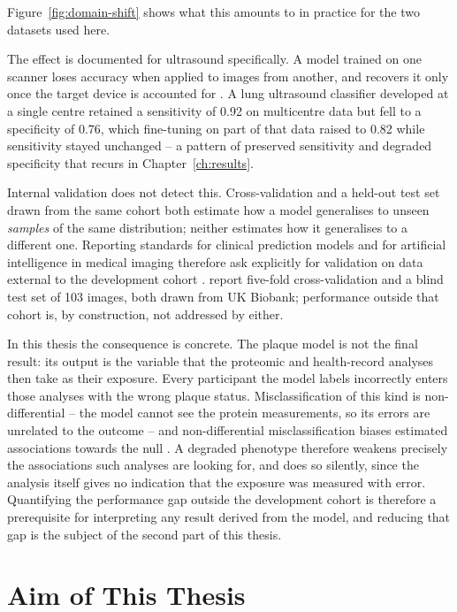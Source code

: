 Figure~\ref{fig:domain-shift} shows what this amounts to in practice for the two datasets used
here.

The effect is documented for ultrasound specifically. A model trained on one scanner loses
accuracy when applied to images from another, and recovers it only once the target device is
accounted for \cite{soylu2025migration}. A lung ultrasound classifier developed at a single
centre retained a sensitivity of 0.92 on multicentre data but fell to a specificity of 0.76,
which fine-tuning on part of that data raised to 0.82 while sensitivity stayed unchanged
\cite{wu2024generalizability} -- a pattern of preserved sensitivity and degraded specificity
that recurs in Chapter~\ref{ch:results}.

Internal validation does not detect this. Cross-validation and a held-out test set drawn
from the same cohort both estimate how a model generalises to unseen \emph{samples} of the
same distribution; neither estimates how it generalises to a different one. Reporting
standards for clinical prediction models and for artificial intelligence in medical imaging
therefore ask explicitly for validation on data external to the development cohort
\cite{collins2015tripod, mongan2020claim}. \textcite{omarov2024deep} report
five-fold cross-validation and a blind test set of 103 images, both drawn from UK Biobank;
performance outside that cohort is, by construction, not addressed by either.

In this thesis the consequence is concrete. The plaque model is not the final result: its
output is the variable that the proteomic and health-record analyses then take as their
exposure. Every participant the model labels incorrectly enters those analyses with the wrong
plaque status. Misclassification of this kind is non-differential -- the model cannot see the
protein measurements, so its errors are unrelated to the outcome -- and non-differential
misclassification biases estimated associations towards the null
\cite{copeland1977bias}. A degraded phenotype therefore weakens precisely the associations
such analyses are looking for, and does so silently, since the analysis itself gives no
indication that the exposure was measured with error. Quantifying the performance gap outside the
development cohort is therefore a prerequisite for interpreting any result derived from the
model, and reducing that gap is the subject of the second part of this thesis.

\section{Aim of This Thesis}
\label{sec:aim}

